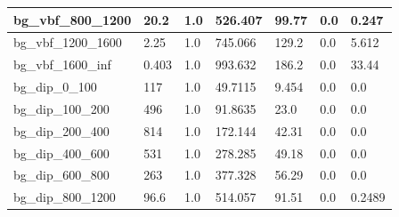 \documentclass[a4paper, 10pt]{article}
\begin{document}
\begin{table}[H]
\begin{center}
\begin{tabular}{|m{23.0mm}|m{23.0mm}|m{18.0mm}|m{19.0mm}|m{19.0mm}|m{19.0mm}|m{19.0mm}|}
      \hline
      {\cellcolor{white}         bg\_vbf\_800\_1200}& {\cellcolor{white}         20.2}& {\cellcolor{white}         1.0}& {\cellcolor{white}         526.407}& {\cellcolor{white}         99.77}& {\cellcolor{green}         0.0}& {\cellcolor{green}         0.247}\\
      \hline
      {\cellcolor{white}         bg\_vbf\_1200\_1600}& {\cellcolor{white}         2.25}& {\cellcolor{white}         1.0}& {\cellcolor{white}         745.066}& {\cellcolor{white}         129.2}& {\cellcolor{orange}         0.0}& {\cellcolor{orange}         5.612}\\
      \hline
      {\cellcolor{white}         bg\_vbf\_1600\_inf}& {\cellcolor{white}         0.403}& {\cellcolor{white}         1.0}& {\cellcolor{white}         993.632}& {\cellcolor{white}         186.2}& {\cellcolor{red}         0.0}& {\cellcolor{red}         33.44}\\
      \hline
      {\cellcolor{white}         bg\_dip\_0\_100}& {\cellcolor{white}         117}& {\cellcolor{white}         1.0}& {\cellcolor{white}         49.7115}& {\cellcolor{white}         9.454}& {\cellcolor{green}         0.0}& {\cellcolor{green}         0.0}\\
      \hline
      {\cellcolor{white}         bg\_dip\_100\_200}& {\cellcolor{white}         496}& {\cellcolor{white}         1.0}& {\cellcolor{white}         91.8635}& {\cellcolor{white}         23.0}& {\cellcolor{green}         0.0}& {\cellcolor{green}         0.0}\\
      \hline
      {\cellcolor{white}         bg\_dip\_200\_400}& {\cellcolor{white}         814}& {\cellcolor{white}         1.0}& {\cellcolor{white}         172.144}& {\cellcolor{white}         42.31}& {\cellcolor{green}         0.0}& {\cellcolor{green}         0.0}\\
      \hline
      {\cellcolor{white}         bg\_dip\_400\_600}& {\cellcolor{white}         531}& {\cellcolor{white}         1.0}& {\cellcolor{white}         278.285}& {\cellcolor{white}         49.18}& {\cellcolor{green}         0.0}& {\cellcolor{green}         0.0}\\
      \hline
      {\cellcolor{white}         bg\_dip\_600\_800}& {\cellcolor{white}         263}& {\cellcolor{white}         1.0}& {\cellcolor{white}         377.328}& {\cellcolor{white}         56.29}& {\cellcolor{green}         0.0}& {\cellcolor{green}         0.0}\\
      \hline
      {\cellcolor{white}         bg\_dip\_800\_1200}& {\cellcolor{white}         96.6}& {\cellcolor{white}         1.0}& {\cellcolor{white}         514.057}& {\cellcolor{white}         91.51}& {\cellcolor{green}         0.0}& {\cellcolor{green}         0.2489}\\

\end{tabular}
\end{center}
\end{table}
\end{document}

